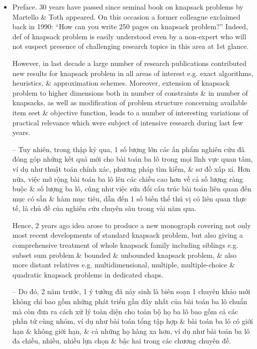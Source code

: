 \documentclass{article}
\begin{document}
\begin{itemize}
    \item {\sf Preface.} 30 years have passed since seminal book on knapsack problems by {\sc Martello \& Toth} appeared. On this occasion a former colleague exclaimed back in 1990: ``How can you write 250 pages on knapsack problem?'' Indeed, def of knapsack problem is easily understood even by a non-expert who will not suspect presence of challenging research topics in this area at 1st glance.
    
    However, in last decade a large number of research publications contributed new results for knapsack problem in all areas of interest e.g. exact algorithms, heuristics, \& approximation schemes. Moreover, extension of knapsack problem to higher dimensions both in number of constraints \& in number of knapsacks, as well as modification of problem structure concerning available item seet \& objective function, leads to a number of interesting variations of practical relevance which were subject of intensive research during last few years.
    
    -- Tuy nhiên, trong thập kỷ qua, 1 số lượng lớn các ấn phẩm nghiên cứu đã đóng góp những kết quả mới cho bài toán ba lô trong mọi lĩnh vực quan tâm, ví dụ như thuật toán chính xác, phương pháp tìm kiếm, \& sơ đồ xấp xỉ. Hơn nữa, việc mở rộng bài toán ba lô lên các chiều cao hơn về cả số lượng ràng buộc \& số lượng ba lô, cũng như việc sửa đổi cấu trúc bài toán liên quan đến mục có sẵn \& hàm mục tiêu, dẫn đến 1 số biến thể thú vị có liên quan thực tế, là chủ đề của nghiên cứu chuyên sâu trong vài năm qua.
    
    Hence, 2 years ago idea arose to produce a new monograph covering not only most recent developments of standard knapsack problem, but also giving a comprehensive treatment of whole knapsack family including siblings e.g. subset sum problem \& bounded \& unbounded knapsack problem, \& also more distant relatives e.g. multidimensional, multiple, multiple-choice \& quadratic knapsack problems in dedicated chaps.
    
    -- Do đó, 2 năm trước, 1 ý tưởng đã nảy sinh là biên soạn 1 chuyên khảo mới không chỉ bao gồm những phát triển gần đây nhất của bài toán ba lô chuẩn mà còn đưa ra cách xử lý toàn diện cho toàn bộ họ ba lô bao gồm cả các phần tử cùng nhóm, ví dụ như bài toán tổng tập hợp \& bài toán ba lô có giới hạn \& không giới hạn, \& cả những họ hàng xa hơn, ví dụ như bài toán ba lô đa chiều, nhiều, nhiều lựa chọn \& bậc hai trong các chương chuyên đề.
    

\end{itemize}
\end{document}
